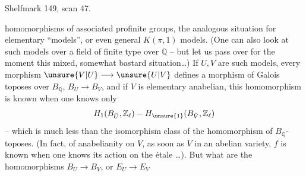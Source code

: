 Shelfmark 149, scan 47.

homomorphisms of associated profinite groups,   the analogous situation for elementary ``models'', or even general $K(\pi,1)$ models. (One can also look at such models over a  field  of finite type over $\mathbb{Q}$ -- but let us pass over for the moment this mixed, somewhat bastard situation\ldots) If $U,V$ are such models, every morphism $\unsure{V|U}\longrightarrow\unsure{U|V}$ defines a morphism of Galois toposes over $B_{\mathbb{Q}}$, $B_U\longrightarrow B_V$,  and if $V$ is  elementary anabelian, this homomorphism is known when one knows only
\[
H_1(B_{\bar U},\mathbb{Z}_{\ell})-H_{\unsure{1}}(B_{\bar V},\mathbb{Z}_{\ell})
\]
-- which is much less than the isomorphism class of the homomorphism of $B_{\mathbb{Q}}$-toposes. (In fact,   of anabelianity on $V$, as soon as $V$  in an abelian variety, $f$ is known when one knows its action on the étale \ldots). But what are the homomorphisms $B_U\longrightarrow B_V$, or $E_U\longrightarrow E_V$
